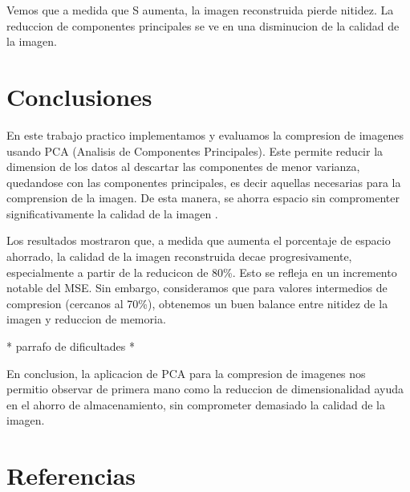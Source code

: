 \documentclass[a4paper,12pt]{article}
\numberwithin{equation}{section}
\numberwithin{figure}{section}
\begin{document}
Vemos que a medida que S aumenta, la imagen reconstruida pierde nitidez. La reduccion de 
componentes principales se ve en una disminucion de la calidad de la imagen. 

\section{Conclusiones}
En este trabajo practico implementamos y evaluamos la compresion de imagenes usando 
PCA (Analisis de Componentes Principales). Este permite reducir la dimension de los datos
al descartar las componentes de menor varianza, quedandose con las componentes principales, 
es decir aquellas necesarias para la comprension de la imagen. De esta manera, se ahorra espacio 
sin compromenter significativamente la calidad de la imagen .

Los resultados mostraron que, a medida que aumenta el porcentaje de espacio ahorrado, la calidad
de la imagen reconstruida decae progresivamente, especialmente a partir de la reducicon de 80\%. 
Esto se refleja en un incremento notable del MSE. Sin embargo, consideramos que
para valores intermedios de compresion (cercanos al 70\%), obtenemos un buen balance entre nitidez 
de la imagen y reduccion de memoria. 

* parrafo de dificultades *

En conclusion, la aplicacion de PCA para la compresion de imagenes nos permitio observar
de primera mano como la reduccion de dimensionalidad ayuda en el ahorro de almacenamiento,
sin comprometer demasiado la calidad de la imagen.




\section*{Referencias}


\end{document}
